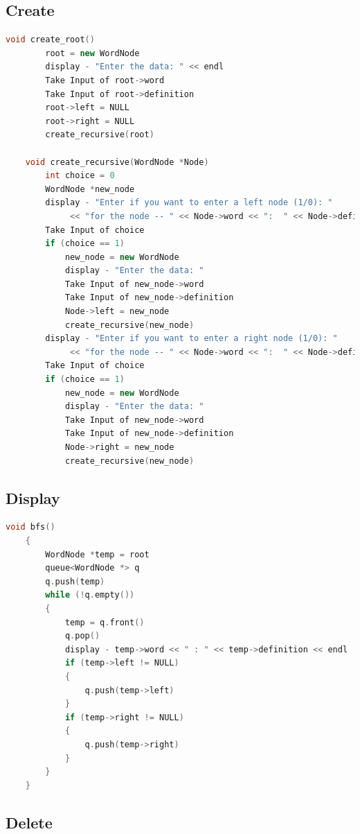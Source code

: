 \documentclass[11pt]{article}
\begin{document}
\subsection{Create}
\begin{lstlisting}[language=C++]
	void create_root()
        root = new WordNode
        display - "Enter the data: " << endl
        Take Input of root->word
        Take Input of root->definition
        root->left = NULL
        root->right = NULL
        create_recursive(root)

    void create_recursive(WordNode *Node)
        int choice = 0
        WordNode *new_node
        display - "Enter if you want to enter a left node (1/0): "
             << "for the node -- " << Node->word << ":  " << Node->definition << "-- "
        Take Input of choice
        if (choice == 1)
            new_node = new WordNode
            display - "Enter the data: "
            Take Input of new_node->word
            Take Input of new_node->definition
            Node->left = new_node
            create_recursive(new_node)
        display - "Enter if you want to enter a right node (1/0): "
             << "for the node -- " << Node->word << ":  " << Node->definition << "-- "
        Take Input of choice
        if (choice == 1)
            new_node = new WordNode
            display - "Enter the data: "
            Take Input of new_node->word
            Take Input of new_node->definition
            Node->right = new_node
            create_recursive(new_node)
\end{lstlisting}
\subsection{Display}
\begin{lstlisting}[language=C++]
    void bfs()
    {
        WordNode *temp = root
        queue<WordNode *> q
        q.push(temp)
        while (!q.empty())
        {
            temp = q.front()
            q.pop()
            display - temp->word << " : " << temp->definition << endl
            if (temp->left != NULL)
            {
                q.push(temp->left)
            }
            if (temp->right != NULL)
            {
                q.push(temp->right)
            }
        }
    }
\end{lstlisting}
\subsection{Delete}
\begin{lstlisting}[language=C++]

\end{lstlisting}
\end{document}
